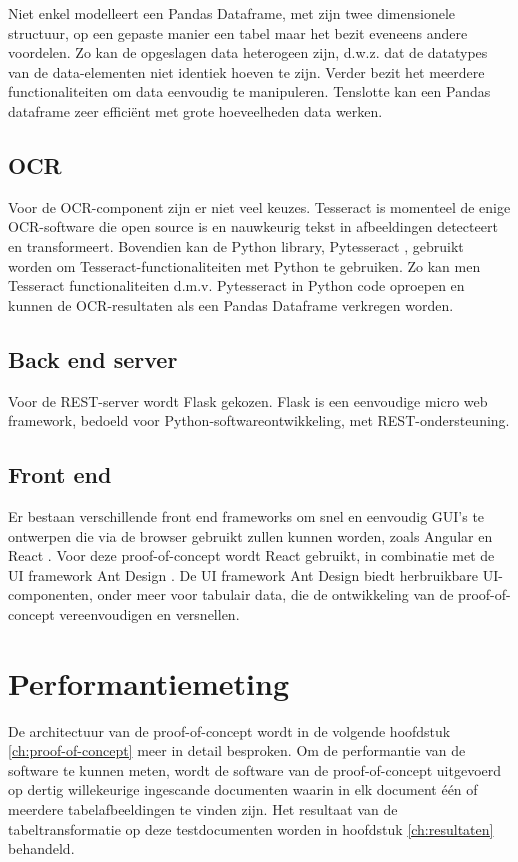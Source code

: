 Niet enkel modelleert een Pandas Dataframe, met zijn twee dimensionele structuur, op een gepaste manier een tabel maar het bezit eveneens andere voordelen. Zo kan de opgeslagen data heterogeen zijn, d.w.z. dat de datatypes van de data-elementen niet identiek hoeven te zijn. Verder bezit het meerdere functionaliteiten om data eenvoudig te manipuleren. Tenslotte kan een Pandas dataframe zeer efficiënt met grote hoeveelheden data werken.

\subsection{\Gls{OCR}}

Voor de \Gls{OCR}-component zijn er niet veel keuzes. Tesseract \autocite{Kay2007} is momenteel de enige \Gls{OCR}-software die open source is en nauwkeurig tekst in afbeeldingen detecteert en transformeert. Bovendien kan de Python library, Pytesseract \autocite{Lee2009}, gebruikt worden om Tesseract-functionaliteiten met Python te gebruiken. Zo kan men Tesseract functionaliteiten d.m.v. Pytesseract in Python code oproepen en kunnen de \Gls{OCR}-resultaten als een Pandas Dataframe verkregen worden.

\subsection{Back end server}

Voor de \Gls{REST}-server wordt Flask \autocite{Grinberg2018} gekozen. Flask is een eenvoudige micro web framework, bedoeld voor Python-softwareontwikkeling, met \Gls{REST}-ondersteuning.

\subsection{Front end}

Er bestaan verschillende front end frameworks om snel en eenvoudig GUI's te ontwerpen die via de browser gebruikt zullen kunnen worden, zoals Angular \autocite{Jain2014} en React \autocite{Fedosejev2016}. Voor deze proof-of-concept wordt React gebruikt, in combinatie met de UI framework Ant Design \autocite{Financial2020}. De UI framework Ant Design biedt herbruikbare UI-componenten, onder meer voor tabulair data, die de ontwikkeling van de proof-of-concept vereenvoudigen en versnellen.

\section{Performantiemeting}
\label{sec:performantie-meting}

De architectuur van de proof-of-concept wordt in de volgende hoofdstuk \ref{ch:proof-of-concept} meer in detail besproken. Om de performantie van de software te kunnen meten, wordt de software van de proof-of-concept uitgevoerd op dertig willekeurige ingescande documenten waarin in elk document één of meerdere tabelafbeeldingen te vinden zijn. Het resultaat van de tabeltransformatie op deze testdocumenten worden in hoofdstuk \ref{ch:resultaten} behandeld.
